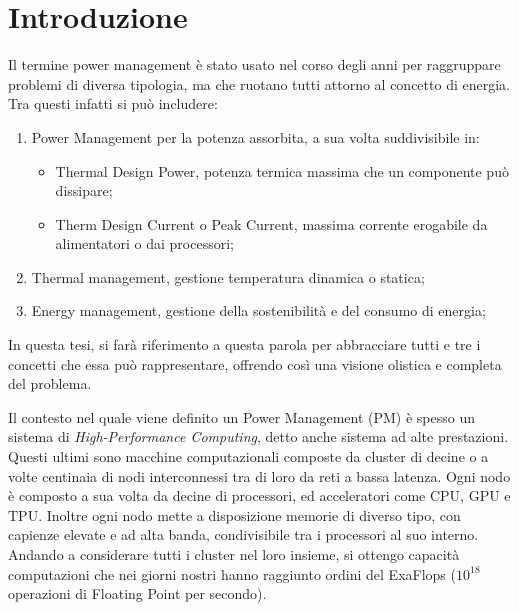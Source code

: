 \chapter{Introduzione}
Il termine power management è stato usato nel corso degli anni per raggruppare problemi di diversa tipologia, ma che ruotano tutti attorno al concetto di energia.
Tra questi infatti si può includere:
\begin{enumerate}
    \item Power Management per la potenza assorbita, a sua volta suddivisibile in:
    \begin{itemize}
        \item Thermal Design Power, potenza termica massima che un componente può dissipare;
        \item Therm Design Current o Peak Current, massima corrente erogabile da alimentatori o dai processori;
    \end{itemize}
    \item Thermal management, gestione temperatura dinamica o statica;
    \item Energy management, gestione della sostenibilità e del consumo di energia;
\end{enumerate}

\noindent In questa tesi, si farà riferimento a questa parola per abbracciare tutti e tre i concetti che essa può rappresentare, offrendo così una visione olistica e completa del problema.

Il contesto nel quale viene definito un Power Management (PM) è spesso un sistema di \emph{High-Performance Computing}, detto anche sistema ad alte prestazioni. Questi ultimi sono macchine computazionali composte da cluster di decine o a volte centinaia di nodi interconnessi tra di loro da reti a bassa latenza. Ogni nodo è composto a sua volta da decine di processori, ed acceleratori come CPU, GPU e TPU.
Inoltre ogni nodo mette a disposizione memorie di diverso tipo, con capienze elevate e ad alta banda, condivisibile tra i processori al suo interno. Andando a considerare tutti i cluster nel loro insieme, si ottengo capacità computazioni che nei giorni nostri hanno raggiunto ordini del ExaFlops ($10^{18}$ operazioni di Floating Point per secondo). 

